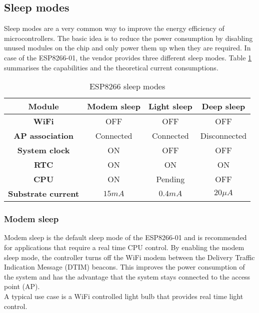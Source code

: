\subsection{Sleep modes}
Sleep modes are a very common way to improve the energy efficiency of microcontrollers.
The basic idea is to reduce the power consumption by disabling unused modules on the chip and only power them up when they are required.
In case of the ESP8266-01, the vendor provides three different sleep modes. 
Table \ref{tab_sleep_modes} summarises the capabilities and the theoretical current consumptions.
\cite{mesquita_assessing_2018}

\begin{table}[htbp]
\caption{ESP8266 sleep modes}
\begin{center}
\begin{tabular}{|c|c|c|c|}
\hline
\textbf{Module}&\textbf{Modem sleep}&\textbf{Light sleep}&\textbf{Deep sleep}\\
\hline
\textbf{WiFi} & OFF & OFF & OFF\\
\textbf{AP association} & Connected & Connected & Disconnected\\
\textbf{System clock} & ON & OFF & OFF\\
\textbf{RTC} & ON & ON & ON\\
\textbf{CPU} & ON & Pending & OFF\\
\hline
\textbf{Substrate current} & $15mA$ & $0.4mA$ & $20\mu A$\\
\hline
\end{tabular}
\label{tab_sleep_modes}
\end{center}
\end{table}

\subsubsection{Modem sleep} \label{sec:modem_sleep}
Modem sleep is the default sleep mode of the ESP8266-01 and is recommended for applications that require a real time CPU control. \cite{mesquita_assessing_2018}
By enabling the modem sleep mode, the controller turns off the WiFi modem between the Delivery Traffic Indication Message (DTIM) beacons. 
This improves the power consumption of the system and has the advantage that the system stays connected to the access point (AP).\\
A typical use case is a WiFi controlled light bulb that provides real time light control.\cite{espressif_inc_esp8266_2016}

